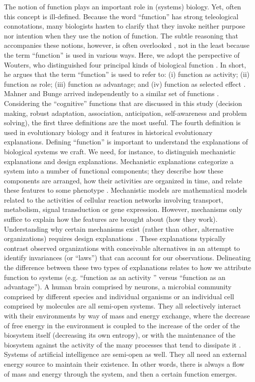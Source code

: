 The notion of function plays an important role in (systems) biology. Yet, often this concept is ill-defined. Because the word ``function'' has strong teleological connotations, many biologists hasten to clarify that they invoke neither purpose nor intention when they use the notion of function. The subtle reasoning that accompanies these notions, however, is often overlooked \cite{wouters_explanation_1999,looijen_holism_1998}, not in the least because the term ``function'' is used in various ways. Here, we adopt the perspective of Wouters, who distinguished four principal kinds of biological function \cite{wouters_explanation_1999}. In short, he argues that the term ``function'' is used to refer to: (i) function as activity; (ii) function as role; (iii) function as advantage; and (iv) function as selected effect \cite{wouters_four_2003,wouters_biologys_2013}. Mahner and Bunge arrived independently to a similar set of functions \cite{mahner_function_2001}. Considering the “cognitive” functions that are discussed in this study (decision making, robust adaptation, association, anticipation, self-awareness and problem solving), the first three definitions are the most useful. The fourth definition is used in evolutionary biology and it features in historical evolutionary explanations.
Defining ``function'' is important to understand the explanations of biological systems we craft. We need, for instance, to distinguish mechanistic explanations and design explanations. Mechanistic explanations categorize a system into a number of functional components; they describe how these components are arranged, how their activities are organized in time, and relate these features to some phenotype \cite{boogerd_mechanistic_2013}. Mechanistic models are mathematical models related to the activities of cellular reaction networks involving transport, metabolism, signal transduction or gene expression. However, mechanisms only suffice to explain how the features are brought about (how they work). Understanding why certain mechanisms exist (rather than other, alternative organizations) requires design explanations \cite{wouters_viability_1995,wouters_design_2007}. These explanations typically contrast observed organizations with conceivable alternatives in an attempt to identify invariances (or ``laws'') that can account for our observations. Delineating the difference between these two types of explanations relates to how we attribute function to systems (e.g. ``function as an activity '' versus ``function as an advantage'').
A human brain comprised by neurons, a microbial community comprised by different species and individual organisms or an individual cell comprised by molecules are all semi-open systems. They all selectively interact with their environments by way of mass and energy exchange, where the decrease of free energy in the environment is coupled to the increase of the order of the biosystem itself (decreasing its own entropy), or with the maintenance of the biosystem against the activity of the many processes that tend to dissipate it \cite{westerhoff_thermodynamics_1987}. Systems of artificial intelligence are semi-open as well. They all need an external energy source to maintain their existence. In other words, there is always a flow of mass and energy through the system, and then a certain function emerges.
